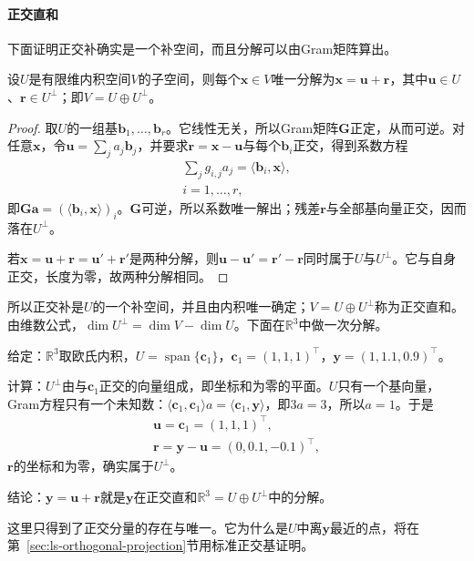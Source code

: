 \paragraph{正交直和}
下面证明正交补确实是一个补空间，而且分解可以由Gram矩阵算出。
\begin{lemma}[正交直和]
\label{lem:ls-orthogonal-decomposition}
设$U$是有限维内积空间$V$的子空间，则每个$\bm x\in V$唯一分解为$\bm x=\bm u+\bm r$，其中$\bm u\in U$、$\bm r\in U^\perp$；即$V=U\oplus U^\perp$。
\end{lemma}
\begin{proof}
取$U$的一组基$\bm b_1,\ldots,\bm b_r$。它线性无关，所以Gram矩阵$\bm G$正定，从而可逆。对任意$\bm x$，令$\bm u=\sum_j a_j\bm b_j$，并要求$\bm r=\bm x-\bm u$与每个$\bm b_i$正交，得到系数方程
\[
 \begin{gathered}
\sum_j g_{i,j}a_j=\langle\bm b_i,\bm x\rangle,\\
i=1,\ldots,r,
 \end{gathered}
\]
即$\bm G\bm a=(\langle\bm b_i,\bm x\rangle)_i$。$\bm G$可逆，所以系数唯一解出；残差$\bm r$与全部基向量正交，因而落在$U^\perp$。

若$\bm x=\bm u+\bm r=\bm u'+\bm r'$是两种分解，则$\bm u-\bm u'=\bm r'-\bm r$同时属于$U$与$U^\perp$。它与自身正交，长度为零，故两种分解相同。
\end{proof}
所以正交补是$U$的一个补空间，并且由内积唯一确定；$V=U\oplus U^\perp$称为正交直和。由维数公式，$\dim U^\perp=\dim V-\dim U$。下面在$\mathbb R^3$中做一次分解。
\begin{example}[向一条直线的正交分解]
\label{ex:ls-orthogonal-decomposition-line}
给定：$\mathbb R^3$取欧氏内积，$U=\operatorname{span}\{\bm c_1\}$，$\bm c_1=(1,1,1)^\top$，$\bm y=(1,1.1,0.9)^\top$。

计算：$U^\perp$由与$\bm c_1$正交的向量组成，即坐标和为零的平面。$U$只有一个基向量，Gram方程只有一个未知数：$\langle\bm c_1,\bm c_1\rangle a=\langle\bm c_1,\bm y\rangle$，即$3a=3$，所以$a=1$。于是
\[
 \begin{gathered}
 \bm u=\bm c_1=(1,1,1)^\top,
 \\
 \bm r=\bm y-\bm u=(0,0.1,-0.1)^\top,
 \end{gathered}
\]
$\bm r$的坐标和为零，确实属于$U^\perp$。

结论：$\bm y=\bm u+\bm r$就是$\bm y$在正交直和$\mathbb R^3=U\oplus U^\perp$中的分解。
\end{example}
这里只得到了正交分量的存在与唯一。它为什么是$U$中离$\bm y$最近的点，将在第~\ref{sec:ls-orthogonal-projection}节用标准正交基证明。

